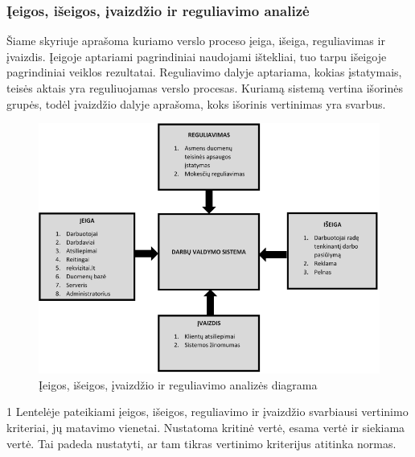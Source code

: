 \documentclass{VUMIFPSkursinis}
\begin{document}
\subsubsection{Įeigos, išeigos, įvaizdžio ir reguliavimo analizė}
Šiame skyriuje aprašoma kuriamo verslo proceso įeiga, išeiga, reguliavimas ir įvaizdis. Įeigoje aptariami pagrindiniai naudojami ištekliai, tuo tarpu išeigoje pagrindiniai veiklos rezultatai. Reguliavimo dalyje aptariama, kokias įstatymais, teisės aktais yra reguliuojamas verslo procesas. Kuriamą sistemą vertina išorinės grupės, todėl įvaizdžio dalyje aprašoma, koks išorinis vertinimas yra svarbus. 
\begin{figure}[H]
\centering
\includegraphics[width=\linewidth]{img/isorine2.png}
\caption{Įeigos, išeigos, įvaizdžio ir reguliavimo analizės diagrama}
\end{figure}
1 Lentelėje pateikiami įeigos, išeigos, reguliavimo ir įvaizdžio svarbiausi vertinimo kriteriai, jų matavimo vienetai. Nustatoma kritinė vertė, esama vertė ir siekiama vertė. Tai padeda nustatyti, ar tam tikras vertinimo kriterijus atitinka normas.
\end{document}
